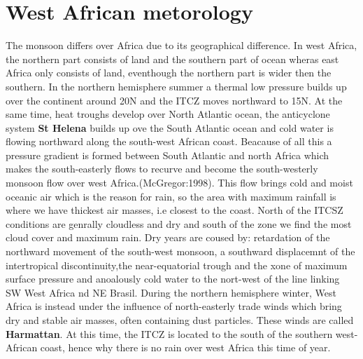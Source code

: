\documentclass{article}
\begin{document}
	\section{West African metorology}
	The monsoon differs over Africa due to its geographical difference. In west Africa, the northern part consists of land and the southern part of ocean wheras east Africa only consists of land, eventhough the northern part is wider then the southern. In the northern hemisphere summer a thermal low pressure builds up over the continent around 20\textdegree N and the ITCZ moves northward to 15\textdegree N. At the same time, heat troughs develop over North Atlantic ocean, the anticyclone system \textbf{St Helena} builds up ove the South Atlantic ocean and cold water is flowing northward along the south-west African coast. Beacause of all this a pressure gradient is formed between South Atlantic and north Africa which makes the south-easterly flows to recurve and become the south-westerly monsoon flow over west Africa.(McGregor:1998). This flow brings cold and moist oceanic air which is the reason for rain, so the area with maximum rainfall is where we have thickest air masses, i.e closest to the coast. North of the ITCSZ conditions are genrally cloudless and dry and south of the zone we find the most cloud cover and maximum rain. Dry years are coused by: retardation of the northward movement of the south-west monsoon, a southward displacemnt of the intertropical discontinuity,the near-equatorial trough and the xone of maximum surface pressure and anoalously cold water to the nort-west of the line linking SW West Africa nd NE Brasil. 
	During the northern hemisphere winter, West Africa is instead under the influence of  north-easterly trade winds which bring dry and stable air masses, often containing dust particles. These winds are called \textbf{Harmattan}. At this time, the ITCZ is located to the south of the southern west-African coast, hence why there is no rain over west Africa this time of year. 
	
\end{document}
